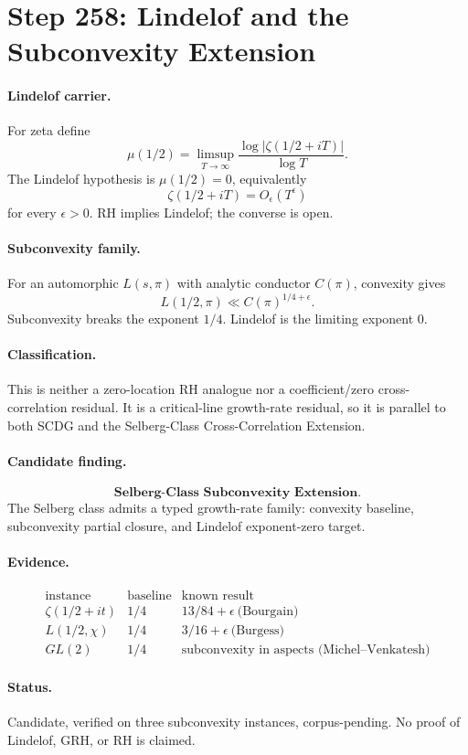 \section*{Step 258: Lindelof and the Subconvexity Extension}

\paragraph{Lindelof carrier.}
For zeta define
\[
\mu(1/2)=\limsup_{T\to\infty}
\frac{\log|\zeta(1/2+iT)|}{\log T}.
\]
The Lindelof hypothesis is \(\mu(1/2)=0\), equivalently
\[
\zeta(1/2+iT)=O_\epsilon(T^\epsilon)
\]
for every \(\epsilon>0\).  RH implies Lindelof; the converse is open.

\paragraph{Subconvexity family.}
For an automorphic \(L(s,\pi)\) with analytic conductor \(C(\pi)\), convexity
gives
\[
L(1/2,\pi)\ll C(\pi)^{1/4+\epsilon}.
\]
Subconvexity breaks the exponent \(1/4\).  Lindelof is the limiting exponent
\(0\).

\paragraph{Classification.}
This is neither a zero-location RH analogue nor a coefficient/zero
cross-correlation residual.  It is a critical-line growth-rate residual, so it
is parallel to both SCDG and the Selberg-Class Cross-Correlation Extension.

\paragraph{Candidate finding.}
\[
\textbf{Selberg-Class Subconvexity Extension.}
\]
The Selberg class admits a typed growth-rate family: convexity baseline,
subconvexity partial closure, and Lindelof exponent-zero target.

\paragraph{Evidence.}
\[
\begin{array}{c|c|c}
\text{instance} & \text{baseline} & \text{known result}\\
\hline
\zeta(1/2+it) & 1/4 & 13/84+\epsilon\ \text{(Bourgain)}\\
L(1/2,\chi) & 1/4 & 3/16+\epsilon\ \text{(Burgess)}\\
GL(2) & 1/4 & \text{subconvexity in aspects (Michel--Venkatesh)}
\end{array}
\]

\paragraph{Status.}
Candidate, verified on three subconvexity instances, corpus-pending.  No proof
of Lindelof, GRH, or RH is claimed.
